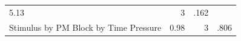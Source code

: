 \documentclass[11pt,]{article}
\begin{document}
\begin{longtable}[]{@{}lrrr@{}}
\begin{minipage}[t]{0.16\columnwidth}
5.13\strut
\end{minipage} & \begin{minipage}[t]{0.06\columnwidth}\raggedleft\strut
3\strut
\end{minipage} & \begin{minipage}[t]{0.06\columnwidth}\raggedleft\strut
.162\strut
\end{minipage}\tabularnewline
\begin{minipage}[t]{0.36\columnwidth}\raggedright\strut
Stimulus by PM Block by Time Pressure\strut
\end{minipage} & \begin{minipage}[t]{0.16\columnwidth}\raggedleft\strut
0.98\strut
\end{minipage} & \begin{minipage}[t]{0.06\columnwidth}\raggedleft\strut
3\strut
\end{minipage} & \begin{minipage}[t]{0.06\columnwidth}\raggedleft\strut
.806\strut
\end{minipage}\tabularnewline
\bottomrule
\end{longtable}
\end{document}
